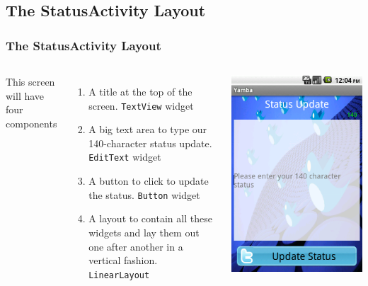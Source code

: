 \subsection{The StatusActivity Layout}
\begin{frame}
\frametitle{The StatusActivity Layout}
\begin{columns}
This screen will have four components
\begin{enumerate}
	\item A title at the top of the screen. \texttt{TextView} widget
	\item A big text area to type our 140-character status update. \texttt{EditText} widget
	\item A button to click to update the status. \texttt{Button} widget
	\item A layout to contain all these widgets and lay them out one after another in a vertical fashion. \texttt{LinearLayout}
\end{enumerate}
	\includegraphics[width= 0.8 \textwidth]{fig-31.eps}
\end{columns}

\end{frame}
